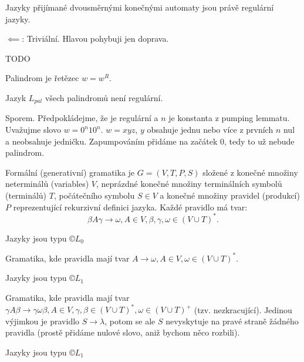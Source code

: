 \documentclass[12pt]{article}                   %
\begin{document}
    \begin{veta}
        Jazyky přijímané dvousměrnými konečnými automaty jsou právě regulární jazyky.

        \begin{dukazin}
            $\impliedby$: Triviální. Hlavou pohybuji jen doprava.
            
            TODO
        \end{dukazin}
    \end{veta}


    \begin{definice}[Palindrom]
        Palindrom je řetězec $w = w^R$.
    \end{definice}

    \begin{lemma}
        Jazyk $L_{pal}$ všech palindromů  není regulární.

        \begin{dukazin}
            Sporem. Předpokládejme, že je regulární a $n$ je konstanta z pumping lemmatu. Uvažujme slovo $w = 0^n 1 0^n$. $w=xyz$, $y$ obsahuje jednu nebo více z prvních $n$ nul a neobsahuje jedničku. Zapumpováním přidáme na začátek 0, tedy to už nebude palindrom.
        \end{dukazin}
    \end{lemma}

    \begin{definice}
        Formální (generativní) gramatika je $G = (V, T, P, S)$ složené z konečné množiny neterminálů (variables) $V$, neprázdné konečné množiny terminálních symbolů (terminálů) $T$, počátečního symbolu $S \in V$ a konečné množiny pravidel (produkcí) $P$ reprezentující rekurzivní definici jazyka. Každé pravidlo má tvar:
        $$ \beta A\gamma \rightarrow \omega, A \in V, \beta, \gamma, \omega \in (V \cup T)^*. $$

        Jazyky jsou typu $©L_0$
    \end{definice}

    \begin{definice}
        Gramatika, kde pravidla mají tvar $A \rightarrow \omega, A \in V, \omega \in (V \cup T)^*$.

        Jazyky jsou typu $©L_1$
    \end{definice}

    \begin{definice}
        Gramatika, kde pravidla mají tvar $\gamma A\beta \rightarrow \gamma\omega\beta, A \in V, \gamma, \beta \in (V \cup T)^*, \omega \in (V \cup T)^+$ (tzv. nezkracující). Jedinou výjimkou je pravidlo $S \rightarrow \lambda$, potom se ale $S$ nevyskytuje na pravé straně žádného pravidla (prostě přidáme nulové slovo, aniž bychom něco rozbili).

        Jazyky jsou typu $©L_1$
    \end{definice}
\end{document}
